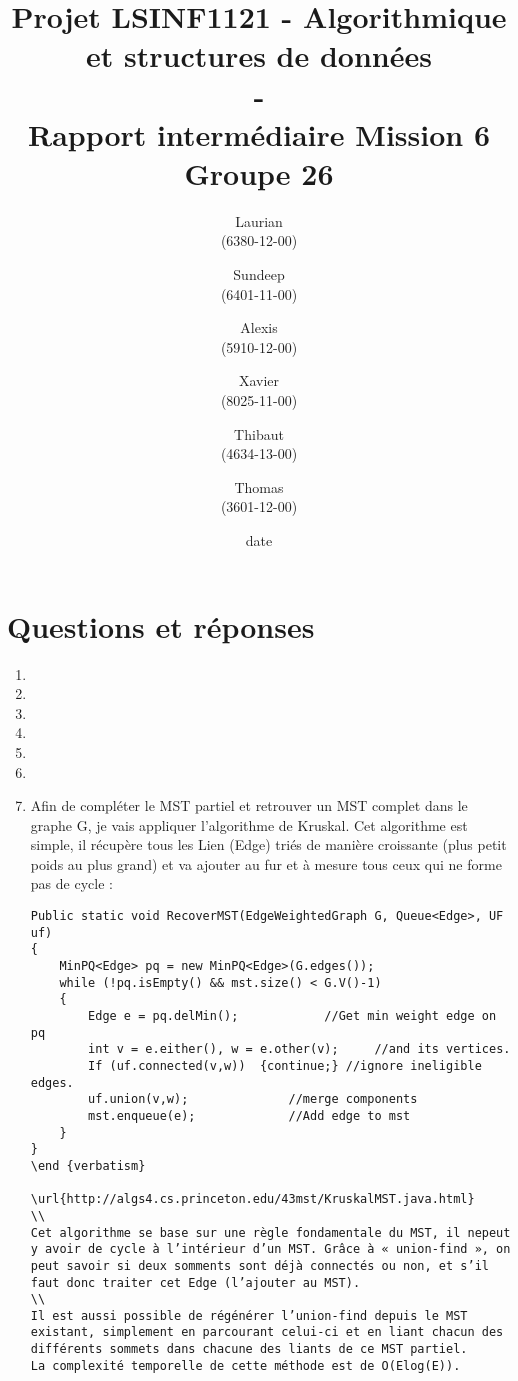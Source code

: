 \documentclass[11pt]{article}
\title{\textbf{Projet LSINF1121 -  Algorithmique et structures de données\\ - \\ Rapport intermédiaire Mission 6} \\ {\large Groupe 26}}
\author{Laurian \bsc{Detiffe} \\(6380-12-00)\and Sundeep \bsc{Dhillon} \\(6401-11-00)\and Alexis \bsc{Macq} \\ (5910-12-00) \and Xavier \bsc{Pérignon} \\ (8025-11-00)\and Thibaut \bsc{Piquard}\\(4634-13-00)\and Thomas \bsc{Wyckmans} \\ (3601-12-00)}
\date{date}
\date{\vspace*{25mm}
\texttt{[image: logo.jpg]}\\
		\vspace*{30mm}
		\begin{center}
		Année académique 2015-2016 \\	
		\end{center}}
\begin{document}
\thispagestyle{empty}

\maketitle
\thispagestyle{empty}

\section*{Questions et réponses}
\begin{enumerate}

\item

\item  

\item 

\item 

\item 

\item 

\item Afin de compléter le MST partiel et retrouver un MST complet dans le graphe G, je vais appliquer l’algorithme de Kruskal. Cet algorithme est simple, il récupère tous les Lien (Edge) triés de manière croissante (plus petit poids au plus grand) et va ajouter au fur et à mesure tous ceux qui ne forme pas de cycle :
\\
\begin {verbatim}
Public static void RecoverMST(EdgeWeightedGraph G, Queue<Edge>, UF uf)
{
	MinPQ<Edge> pq = new MinPQ<Edge>(G.edges());
	while (!pq.isEmpty() && mst.size() < G.V()-1)
	{
		Edge e = pq.delMin();   		 //Get min weight edge on pq
		int v = e.either(), w = e.other(v); 	//and its vertices.
		If (uf.connected(v,w))  {continue;}	//ignore ineligible edges.
		uf.union(v,w); 				//merge components 
		mst.enqueue(e);				//Add edge to mst
	}
}
\end {verbatism}

\url{http://algs4.cs.princeton.edu/43mst/KruskalMST.java.html}
\\
Cet algorithme se base sur une règle fondamentale du MST, il nepeut y avoir de cycle à l’intérieur d’un MST. Grâce à « union-find », on peut savoir si deux somments sont déjà connectés ou non, et s’il faut donc traiter cet Edge (l’ajouter au MST).
\\
Il est aussi possible de régénérer l’union-find depuis le MST existant, simplement en parcourant celui-ci et en liant chacun des différents sommets dans chacune des liants de ce MST partiel.
La complexité temporelle de cette méthode est de O(Elog(E)).


\end{verbatim}
\end{enumerate}
\end{document}
